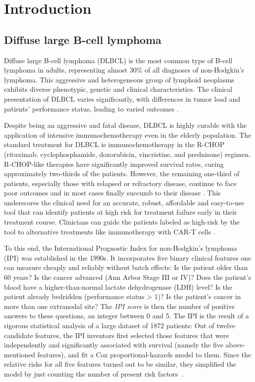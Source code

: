 \chapter{Introduction} \label{chap:intro}

\section{Diffuse large B-cell lymphoma}

Diffuse large B-cell lymphoma (DLBCL) is the most common type of B-cell lymphoma in adults, 
representing almost 30\% of all diagnoses of non-Hodgkin's lymphoma. 
This aggressive and heterogeneous group of 
lymphoid neoplasms exhibits
diverse phenotypic, genetic and clinical characteristics. The clinical presentation of 
DLBCL varies significantly, with differences in tumor load and patients' performance status, leading 
to varied outcomes \cite{dlbcl-review21}.

Despite being an aggressive and fatal disease, DLBCL is highly curable with the 
application of intensive immunochemotherapy even in the elderly population. The standard treatment 
for DLBCL is immunochemotherapy in the R-CHOP (rituximab, cyclophosphamide, doxorubicin, 
vincristine, and prednisone) regimen. R-CHOP-like therapies
have significantly improved survival rates, curing approximately two-thirds of the patients. 
However, the remaining one-third of patients, especially 
those with relapsed or refractory disease, continue to face poor outcomes and in most cases finally 
succumb to their disease \citep{glass17}. This underscores the clinical 
need for an accurate, robust, affordable and easy-to-use tool that can identify patients at high risk 
for treatment failure early in their treatment course. Clinicians can guide the patients labeled 
as high-risk by the tool to alternative treatments like immunotherapy with CAR-T cells 
\cite{wang20}.

To this end, the International Prognostic Index for non-Hodgkin's lymphoma (IPI) was established in 
the 1990s. It incorporates five binary clinical features one can measure cheaply and 
reliably without batch effects: Is the patient older than \num{60} years? Is the cancer advanced 
(Ann Arbor Stage III or IV)? Does the patient's blood have a higher-than-normal lactate dehydrogenase (LDH) 
level? Is the patient already 
bedridden (performance status > 1)? Is the patient's cancer in more than one extranodal site? The 
\textit{IPI score} is then the number of positive answers to these questions, an integer between 0 
and 5. The IPI is the result of a rigorous statistical analysis 
of a large dataset of \num{1872} patients: Out of twelve candidate features, the IPI inventors
first selected those features that were independently and significantly associated with survival 
(namely the five above-mentioned features), and fit a Cox proportional-hazards model to them.
Since the relative risks for all five features turned out to be similar, they simplified the model 
by just counting the number of present risk factors~\cite{ipi93}. 

